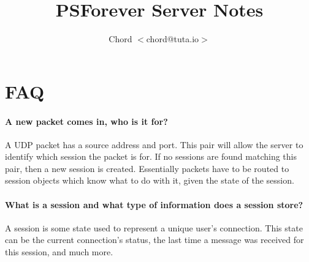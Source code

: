 \documentclass{article}
\begin{document}
\title{PSForever Server Notes}
 
\author{Chord $<$chord@tuta.io$>$}
 
\maketitle

%
%
%
%

\section*{FAQ}
\paragraph*{A new packet comes in, who is it for?}
A UDP packet has a source address and port. This pair will allow the
server to identify which session the packet is for. If no sessions are found
matching this pair, then a new session is created. Essentially packets have to
be routed to session objects which know what to do with it, given the state of the session.

\paragraph*{What is a session and what type of information does a session store?}
A session is some state used to represent a unique user's connection. This
state can be the current connection's status, the last time a message was
received for this session, and much more.

\paragraph*{}


\begin{thebibliography}{99}

\end{thebibliography}
\end{document}
